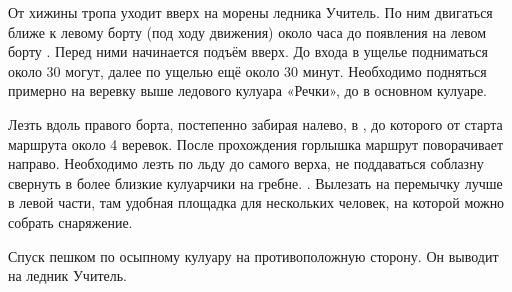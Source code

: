 От хижины \geoLighthouse тропа уходит вверх на морены ледника Учитель.
По ним двигаться ближе к левому борту (под ходу движения) около часа
до появления на левом борту . Перед ними начинается подъём вверх. До входа в ущелье
подниматься около 30 могут, далее по ущелью ещё около 30 минут.
Необходимо подняться примерно на веревку выше ледового кулуара
«Речки», до  в
основном кулуаре.

Лезть вдоль правого борта, постепенно забирая налево, в
, до
которого от старта маршрута около 4 веревок. После прохождения
горлышка маршрут поворачивает направо. Необходимо лезть по льду до
самого верха, не поддаваться соблазну свернуть в более близкие
кулуарчики на гребне. .
Вылезать на перемычку лучше в левой части, там удобная площадка для
нескольких человек, на которой можно собрать снаряжение.

Спуск пешком по осыпному кулуару на противоположную сторону. Он
выводит на ледник Учитель.
